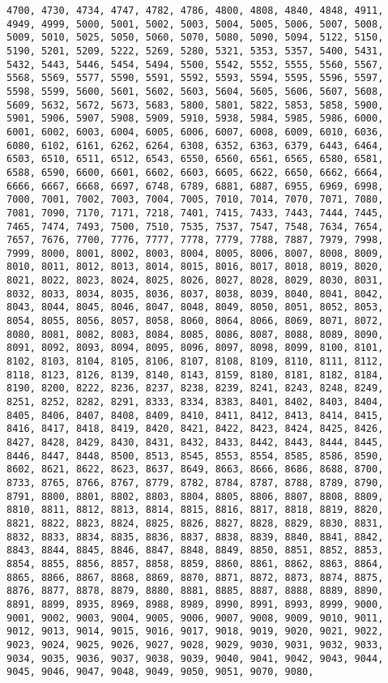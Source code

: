 \begin{lstlisting}[basicstyle=\scriptsize]
4700, 4730, 4734, 4747, 4782, 4786, 4800, 4808, 4840, 4848, 4911, 4949, 4999, 5000, 5001, 5002, 5003, 5004, 5005, 5006, 5007, 5008, 5009, 5010, 5025, 5050, 5060, 5070, 5080, 5090, 5094, 5122, 5150, 5190, 5201, 5209, 5222, 5269, 5280, 5321, 5353, 5357, 5400, 5431, 5432, 5443, 5446, 5454, 5494, 5500, 5542, 5552, 5555, 5560, 5567, 5568, 5569, 5577, 5590, 5591, 5592, 5593, 5594, 5595, 5596, 5597, 5598, 5599, 5600, 5601, 5602, 5603, 5604, 5605, 5606, 5607, 5608, 5609, 5632, 5672, 5673, 5683, 5800, 5801, 5822, 5853, 5858, 5900, 5901, 5906, 5907, 5908, 5909, 5910, 5938, 5984, 5985, 5986, 6000, 6001, 6002, 6003, 6004, 6005, 6006, 6007, 6008, 6009, 6010, 6036, 6080, 6102, 6161, 6262, 6264, 6308, 6352, 6363, 6379, 6443, 6464, 6503, 6510, 6511, 6512, 6543, 6550, 6560, 6561, 6565, 6580, 6581, 6588, 6590, 6600, 6601, 6602, 6603, 6605, 6622, 6650, 6662, 6664, 6666, 6667, 6668, 6697, 6748, 6789, 6881, 6887, 6955, 6969, 6998, 7000, 7001, 7002, 7003, 7004, 7005, 7010, 7014, 7070, 7071, 7080, 7081, 7090, 7170, 7171, 7218, 7401, 7415, 7433, 7443, 7444, 7445, 7465, 7474, 7493, 7500, 7510, 7535, 7537, 7547, 7548, 7634, 7654, 7657, 7676, 7700, 7776, 7777, 7778, 7779, 7788, 7887, 7979, 7998, 7999, 8000, 8001, 8002, 8003, 8004, 8005, 8006, 8007, 8008, 8009, 8010, 8011, 8012, 8013, 8014, 8015, 8016, 8017, 8018, 8019, 8020, 8021, 8022, 8023, 8024, 8025, 8026, 8027, 8028, 8029, 8030, 8031, 8032, 8033, 8034, 8035, 8036, 8037, 8038, 8039, 8040, 8041, 8042, 8043, 8044, 8045, 8046, 8047, 8048, 8049, 8050, 8051, 8052, 8053, 8054, 8055, 8056, 8057, 8058, 8060, 8064, 8066, 8069, 8071, 8072, 8080, 8081, 8082, 8083, 8084, 8085, 8086, 8087, 8088, 8089, 8090, 8091, 8092, 8093, 8094, 8095, 8096, 8097, 8098, 8099, 8100, 8101, 8102, 8103, 8104, 8105, 8106, 8107, 8108, 8109, 8110, 8111, 8112, 8118, 8123, 8126, 8139, 8140, 8143, 8159, 8180, 8181, 8182, 8184, 8190, 8200, 8222, 8236, 8237, 8238, 8239, 8241, 8243, 8248, 8249, 8251, 8252, 8282, 8291, 8333, 8334, 8383, 8401, 8402, 8403, 8404, 8405, 8406, 8407, 8408, 8409, 8410, 8411, 8412, 8413, 8414, 8415, 8416, 8417, 8418, 8419, 8420, 8421, 8422, 8423, 8424, 8425, 8426, 8427, 8428, 8429, 8430, 8431, 8432, 8433, 8442, 8443, 8444, 8445, 8446, 8447, 8448, 8500, 8513, 8545, 8553, 8554, 8585, 8586, 8590, 8602, 8621, 8622, 8623, 8637, 8649, 8663, 8666, 8686, 8688, 8700, 8733, 8765, 8766, 8767, 8779, 8782, 8784, 8787, 8788, 8789, 8790, 8791, 8800, 8801, 8802, 8803, 8804, 8805, 8806, 8807, 8808, 8809, 8810, 8811, 8812, 8813, 8814, 8815, 8816, 8817, 8818, 8819, 8820, 8821, 8822, 8823, 8824, 8825, 8826, 8827, 8828, 8829, 8830, 8831, 8832, 8833, 8834, 8835, 8836, 8837, 8838, 8839, 8840, 8841, 8842, 8843, 8844, 8845, 8846, 8847, 8848, 8849, 8850, 8851, 8852, 8853, 8854, 8855, 8856, 8857, 8858, 8859, 8860, 8861, 8862, 8863, 8864, 8865, 8866, 8867, 8868, 8869, 8870, 8871, 8872, 8873, 8874, 8875, 8876, 8877, 8878, 8879, 8880, 8881, 8885, 8887, 8888, 8889, 8890, 8891, 8899, 8935, 8969, 8988, 8989, 8990, 8991, 8993, 8999, 9000, 9001, 9002, 9003, 9004, 9005, 9006, 9007, 9008, 9009, 9010, 9011, 9012, 9013, 9014, 9015, 9016, 9017, 9018, 9019, 9020, 9021, 9022, 9023, 9024, 9025, 9026, 9027, 9028, 9029, 9030, 9031, 9032, 9033, 9034, 9035, 9036, 9037, 9038, 9039, 9040, 9041, 9042, 9043, 9044, 9045, 9046, 9047, 9048, 9049, 9050, 9051, 9070, 9080, 
\end{lstlisting}
